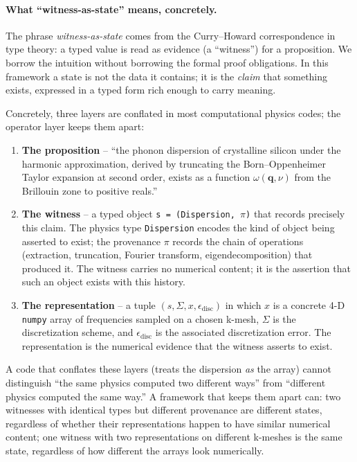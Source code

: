 \documentclass[11pt,a4paper]{article}
\begin{document}
\paragraph{What ``witness-as-state'' means, concretely.}

The phrase \emph{witness-as-state} comes from the Curry--Howard correspondence in type theory:
a typed value is read as evidence (a ``witness'') for a proposition. We borrow the intuition
without borrowing the formal proof obligations. In this framework a state is not the data it
contains; it is the \emph{claim} that something exists, expressed in a typed form rich enough
to carry meaning.

Concretely, three layers are conflated in most computational physics codes; the operator layer keeps
them apart:

\begin{enumerate}[leftmargin=2em]
  \item \textbf{The proposition} -- ``the phonon dispersion of crystalline silicon under the
        harmonic approximation, derived by truncating the Born--Oppenheimer Taylor expansion at
        second order, exists as a function $\omega(\mathbf{q}, \nu)$ from the Brillouin zone to
        positive reals.''
  \item \textbf{The witness} -- a typed object \texttt{s = (Dispersion, $\pi$)} that records
        precisely this claim. The physics type \texttt{Dispersion} encodes the kind of object
        being asserted to exist; the provenance $\pi$ records the chain of operations
        (extraction, truncation, Fourier transform, eigendecomposition) that produced it. The
        witness carries no numerical content; it is the assertion that such an object exists
        with this history.
  \item \textbf{The representation} -- a tuple $(s, \Sigma, x, \epsilon_{\text{disc}})$ in
        which $x$ is a concrete 4-D \texttt{numpy} array of frequencies sampled on a chosen
        k-mesh, $\Sigma$ is the discretization scheme, and $\epsilon_{\text{disc}}$ is the
        associated discretization error. The representation is the numerical evidence that the
        witness asserts to exist.
\end{enumerate}

A code that conflates these layers (treats the dispersion \emph{as} the array) cannot
distinguish ``the same physics computed two different ways'' from ``different physics computed
the same way.'' A framework that keeps them apart can: two witnesses with identical types but
different provenance are different states, regardless of whether their representations happen
to have similar numerical content; one witness with two representations on different k-meshes
is the same state, regardless of how different the arrays look numerically.
\end{document}
